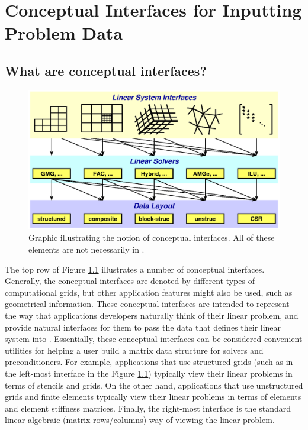 \chapter{Conceptual Interfaces for Inputting Problem Data}
\label{Conceptual Interfaces}

\section{What are conceptual interfaces?}



\begin{figure}
\centering
\includegraphics[width=5in]{concep_iface.eps}
\caption{%
Graphic illustrating the notion of conceptual interfaces.
All of these elements are not necessarily in \hypre{}.}
\label{fig-conceptual-interface}
\end{figure}

The top row of Figure \ref{fig-conceptual-interface} 
illustrates a number of conceptual interfaces.  Generally,
the conceptual interfaces are denoted by different types of computational
grids,  but other application features might also be used, such as
geometrical information.  
These conceptual interfaces are intended to represent the
way that applications developers naturally think of their linear problem, and
provide natural interfaces for them to pass the data that defines
their linear system into \hypre{}. 
Essentially, these conceptual interfaces can be considered  
convenient utilities for helping a user build a matrix data structure
for \hypre{} solvers and preconditioners.
For
example, applications that use structured grids (such as in the left-most
interface in the Figure \ref{fig-conceptual-interface})
typically view their linear problems in terms of
stencils and grids.  On the other hand, applications that use unstructured
grids and finite elements typically view their linear problems in terms of
elements and element stiffness matrices.  Finally, the right-most interface is
the standard linear-algebraic (matrix rows/columns) way of viewing the
linear problem.

